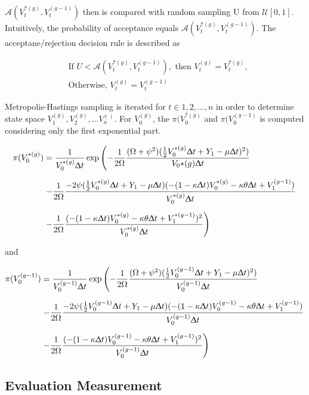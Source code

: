 \documentclass[12pt,a4paper]{article}
\numberwithin{equation}{section}
\begin{document}
$\mathcal{A}(V_t^{*(g)}, V_t^{(g-1)})$ then is compared with random sampling U from $\mathcal{U}[0, 1]$. Intuitively, the probability of acceptance equals $\mathcal{A}(V_t^{*(g)}, V_t^{(g-1)})$. The acceptane/rejection decision rule is described as

\begin{align*}
&\text{If } U< \mathcal{A}(V_t^{*(g)}, V_t^{(g-1)}), \text{ then } V_t^{(g)} = V_t^{*(g)},\\
&\text{Otherwise, }  V_t^{(g)} = V_t^{(g-1)}
\end{align*} 

Metropolis-Hastings sampling is iterated for $t \in {1, 2, ..., n}$ in order to determine state space $V_1^{(g)}, V_2^{(g)}, ...V_n^{()}$. For $V_0^{(g)}$, the $\pi(V_0^{*(g)}$ and $\pi(V_0^{(g-1)}$ is computed considering only the first exponential part. 

\begin{align*}
\pi(V_0^{*(g)}) &= \frac{1}{V_0^{*(g)} \Updelta t} \exp \left( -\frac{1}{2 \Omega} \frac{(\Omega + \psi^2)(\frac{1}{2} V_0^{*(g)} \Updelta t + Y_{1} - \mu \Updelta t)^2)}{V_0{*(g)} \Updelta t} \right.\\[0.6em]
& \left. -\frac{1}{2\Omega}\frac{-2\psi (\frac{1}{2}V_0^{*(g)} \Updelta t + Y_{1} - \mu \Updelta t)(-(1-\kappa\Updelta t) V_0^{*(g)} -\kappa \theta \Updelta t + V_{1}^{(g-1)})}{V_0^{*(g)} \Updelta t} \right.\\[0.6em]
& \left. -\frac{1}{2\Omega}\frac{(-(1-\kappa \Updelta t) V_0^{*(g)} -\kappa \theta \Updelta t + V_{1}^{*(g-1)})^2}{V_0^{*(g)} \Updelta t} \right)
\end{align*}

and 

\begin{align*}
\pi(V_0^{(g-1)}) &= \frac{1}{V_0^{(g-1)} \Updelta t} \exp \left( -\frac{1}{2 \Omega} \frac{(\Omega + \psi^2)(\frac{1}{2} V_0^{(g-1)} \Updelta t + Y_{1} - \mu \Updelta t)^2)}{V_0^{(g-1)} \Updelta t} \right.\\[0.6em]
& \left. -\frac{1}{2\Omega}\frac{-2\psi (\frac{1}{2}V_0^{(g-1)} \Updelta t + Y_{1} - \mu \Updelta t)(-(1-\kappa\Updelta t) V_0^{(g-1)} -\kappa \theta \Updelta t + V_{1}^{(g-1)})}{V_0^{(g-1)} \Updelta t} \right.\\[0.6em]
& \left. -\frac{1}{2\Omega}\frac{(-(1-\kappa \Updelta t) V_0^{(g-1)} -\kappa \theta \Updelta t + V_{1}^{(g-1)})^2}{V_0^{(g-1)} \Updelta t} \right)
\end{align*}


\subsection{Evaluation Measurement}
\end{document}
